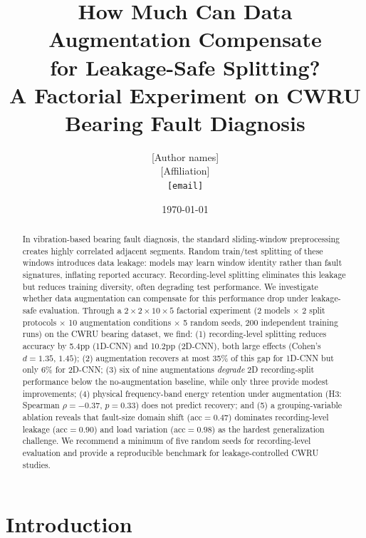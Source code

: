 ﻿\documentclass[11pt,a4paper]{article}
\title{\textbf{How Much Can Data Augmentation Compensate\\for Leakage-Safe Splitting?}\\[4pt]
\large A Factorial Experiment on CWRU Bearing Fault Diagnosis}
\author{[Author names]\\
\small [Affiliation]\\
\small \texttt{[email]}}
\date{\today}
\begin{document}
\maketitle

\begin{abstract}
In vibration-based bearing fault diagnosis, the standard sliding-window preprocessing creates highly correlated adjacent segments. Random train/test splitting of these windows introduces data leakage: models may learn window identity rather than fault signatures, inflating reported accuracy. Recording-level splitting eliminates this leakage but reduces training diversity, often degrading test performance. We investigate whether data augmentation can compensate for this performance drop under leakage-safe evaluation. Through a $2\times2\times10\times5$ factorial experiment (2 models $\times$ 2 split protocols $\times$ 10 augmentation conditions $\times$ 5 random seeds, 200 independent training runs) on the CWRU bearing dataset, we find: (1) recording-level splitting reduces accuracy by 5.4pp (1D-CNN) and 10.2pp (2D-CNN), both large effects (Cohen's $d=1.35$, $1.45$); (2) augmentation recovers at most 35\% of this gap for 1D-CNN but only 6\% for 2D-CNN; (3) six of nine augmentations \emph{degrade} 2D recording-split performance below the no-augmentation baseline, while only three provide modest improvements; (4) physical frequency-band energy retention under augmentation (H3: Spearman $\rho=-0.37$, $p=0.33$) does not predict recovery; and (5) a grouping-variable ablation reveals that fault-size domain shift ($\text{acc}=0.47$) dominates recording-level leakage ($\text{acc}=0.90$) and load variation ($\text{acc}=0.98$) as the hardest generalization challenge. We recommend a minimum of five random seeds for recording-level evaluation and provide a reproducible benchmark for leakage-controlled CWRU studies.
\end{abstract}

\section{Introduction}
\end{document}

